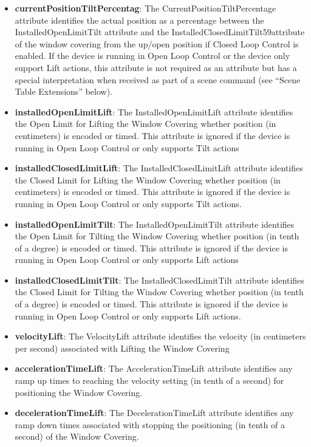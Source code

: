 \begin{itemize}
\item \textbf{currentPositionTiltPercentag}: The CurrentPositionTiltPercentage attribute identifies the actual position as a percentage between the InstalledOpenLimitTilt attribute and the InstalledClosedLimitTilt59attribute of the window covering from the up/open position if Closed Loop Control is enabled. If the device is running in Open Loop Control or the device only support Lift actions, this attribute is not required as an attribute but has a special interpretation when received as part of a scene command (see “Scene Table Extensions” below).
\item \textbf{installedOpenLimitLift}: The InstalledOpenLimitLift attribute identifies the Open Limit for Lifting the Window Covering whether position (in centimeters) is encoded or timed. This attribute is ignored if the device is running in Open Loop Control or only supports Tilt actions
\item \textbf{installedClosedLimitLift}: The InstalledClosedLimitLift attribute identifies the Closed Limit for Lifting the Window Covering whether position (in centimeters) is encoded or timed. This attribute is ignored if the device is running in Open Loop Control or only supports Tilt actions.
\item \textbf{installedOpenLimitTilt}: The InstalledOpenLimitTilt attribute identifies the Open Limit for Tilting the Window Covering whether position (in tenth of a degree) is encoded or timed. This attribute is ignored if the device is running in Open Loop Control or only supports Lift actions
\item \textbf{installedClosedLimitTilt}: The InstalledClosedLimitTilt attribute identifies the Closed Limit for Tilting the Window Covering whether position (in tenth of a degree) is encoded or timed. This attribute is ignored if the device is running in Open Loop Control or only supports Lift actions.
\item \textbf{velocityLift}: The VelocityLift attribute identifies the velocity (in centimeters per second) associated with Lifting the Window Covering
\item \textbf{accelerationTimeLift}: The AccelerationTimeLift attribute identifies any ramp up times to reaching the velocity setting (in tenth of a second) for positioning the Window Covering.
\item \textbf{decelerationTimeLift}: The DecelerationTimeLift attribute identifies any ramp down times associated with stopping the positioning (in tenth of a second) of the Window Covering.

\end{itemize}
